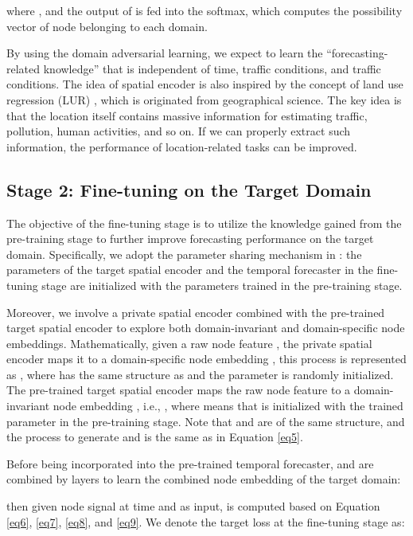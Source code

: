 \documentclass[sigconf]{acmart}
\theoremstyle{definition}
\begin{document}
where , and the output of  is fed into the softmax, which computes the possibility vector of node  belonging to each domain.

By using the domain adversarial learning, we expect to learn the ``forecasting-related knowledge'' that is independent of time, traffic conditions, and traffic conditions. The idea of spatial encoder is also inspired by the concept of land use regression (LUR) \cite{steininger2020maplur}, which is originated from geographical science. The key idea is that the location itself contains massive information for estimating traffic, pollution, human activities, and so on. If we can properly extract such information, the performance of location-related tasks can be improved. 


\subsection{Stage 2: Fine-tuning on the Target Domain}

The objective of the fine-tuning stage is to utilize the knowledge gained from the pre-training stage to further improve forecasting performance on the target domain. 
Specifically, we adopt the parameter sharing mechanism in \cite{pan2009survey}: the parameters of the target spatial encoder and the temporal forecaster in the fine-tuning stage are initialized with the parameters trained in the pre-training stage.

Moreover, we involve a private spatial encoder combined with the pre-trained target spatial encoder to explore both domain-invariant and domain-specific node embeddings. Mathematically, given a raw node feature , the private spatial encoder maps it to a domain-specific node embedding , this process is represented as , where  has the same structure as  and the parameter  is randomly initialized. The pre-trained target spatial encoder maps the raw node feature  to a domain-invariant node embedding , i.e., , where  means that  is initialized with the trained parameter  in the pre-training stage. Note that  and   are of the same structure, and the process to generate  and  is the same as in Equation \ref{eq5}.

Before being incorporated into the pre-trained temporal forecaster,    and  are combined by  layers to learn the combined node embedding  of the target domain:

then given node signal  at time  and  as input,  is computed based on Equation \ref{eq6}, \ref{eq7}, \ref{eq8}, and \ref{eq9}. We denote the target loss at the fine-tuning stage as:
\end{document}
